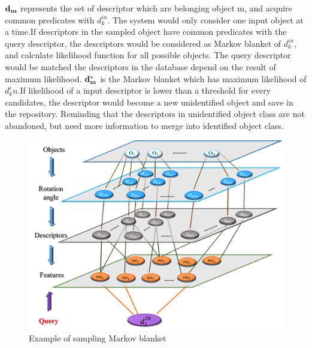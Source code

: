 \documentclass[journal]{IEEEtran}
\begin{document}
$\bf{d_m}$ represents the set of descriptor which are belonging object m, and acquire common predicates with $d^{in}_k$. The system would only consider one input object at a time.If descriptors in the sampled object have common predicates with the query descriptor, the descriptors would be considered as Markov blanket of $d^{in}_k$, and calculate likelihood function for all possible objects. The query descriptor would be matched the descriptors in the database depend on the result of maximum likelihood. $\bf{d_m^*}$ is the Markov blanket which has maximum likelihood of $d_k^in$.If likelihood of a input descriptor is lower than a threshold for every candidates, the descriptor would become a new unidentified object and save in the repository. Reminding that the descriptors in unidentified object class are not abandoned, but need more information to merge into identified object class. 

\begin{figure}[!t]
\begin{center}
\includegraphics*[width=3 in]{j_img/fig5.png}
\caption{Example of sampling Markov blanket}\label{test}
\end{center}
\end{figure}
\end{document}
